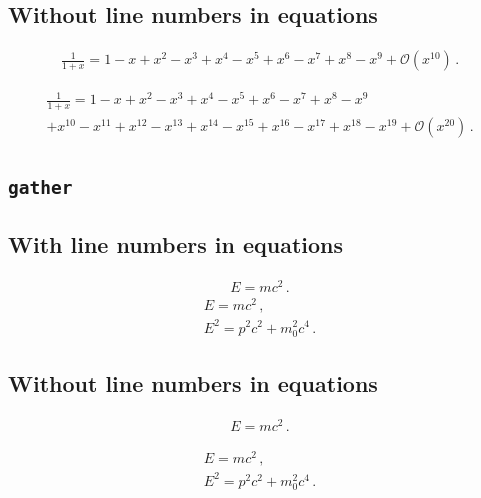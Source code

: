 \subsection*{Without line numbers in equations}
\nextlipsum
\begin{linenomath*}
\begin{multline*}
  \frac{1}{1 + x} = 1 - x + x^{2} - x^{3} + x^{4} - x^{5} + x^{6} - x^{7} + x^{8} - x^{9} + \mathcal{O}(x^{10}) \,.
\end{multline*}
\end{linenomath*}
\nextlipsum
\begin{linenomath*}
\begin{multline*}
  \frac{1}{1 + x} = 1 - x + x^{2} - x^{3} + x^{4} - x^{5} + x^{6} - x^{7} + x^{8} - x^{9} \\
  + x^{10} - x^{11} + x^{12} - x^{13} + x^{14} - x^{15} + x^{16} - x^{17} + x^{18} - x^{19} + \mathcal{O}(x^{20}) \,.
\end{multline*}
\end{linenomath*}
\nextlipsum

\subsection*{\texttt{gather}}

\subsection*{With line numbers in equations}
\nextlipsum
\begin{gather}
  E = m c^2 \,.
\end{gather}
\nextlipsum
\begin{gather}
  E = m c^2 \,, \\
  E^2 = p^2 c^2 + m_0^2 c^4 \,.
\end{gather}
\nextlipsum

\subsection*{Without line numbers in equations}
\nextlipsum
\begin{linenomath*}
\begin{gather}
  E = m c^2 \,.
\end{gather}
\end{linenomath*}
\nextlipsum
\begin{linenomath*}
\begin{gather}
  E = m c^2 \,, \\
  E^2 = p^2 c^2 + m_0^2 c^4 \,.
\end{gather}
\end{linenomath*}
\nextlipsum

